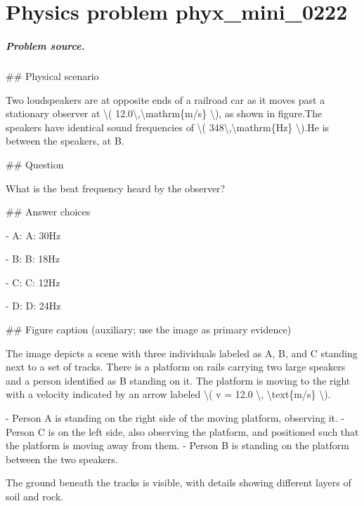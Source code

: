 
\chapter{Physics problem phyx\_mini\_0222}
\label{ch:PhyXMiniProblems_problem_phyx_mini_0222}

\paragraph{Problem source.}
\#\# Physical scenario

Two loudspeakers are at opposite ends of a railroad car as it moves past a stationary observer at \textbackslash{}( 12.0\textbackslash{},\textbackslash{}mathrm\{m/s\} \textbackslash{}), as shown in figure.The speakers have identical sound frequencies of \textbackslash{}( 348\textbackslash{},\textbackslash{}mathrm\{Hz\} \textbackslash{}).He is between the speakers, at B.

\#\# Question

What is the beat frequency heard by the observer?

\#\# Answer choices

- A: A: 30Hz

- B: B: 18Hz

- C: C: 12Hz

- D: D: 24Hz

\#\# Figure caption (auxiliary; use the image as primary evidence)

The image depicts a scene with three individuals labeled as A, B, and C standing next to a set of tracks. There is a platform on rails carrying two large speakers and a person identified as B standing on it. The platform is moving to the right with a velocity indicated by an arrow labeled \textbackslash{}( v = 12.0 \textbackslash{}, \textbackslash{}text\{m/s\} \textbackslash{}).

- Person A is standing on the right side of the moving platform, observing it.
- Person C is on the left side, also observing the platform, and positioned such that the platform is moving away from them.
- Person B is standing on the platform between the two speakers.

The ground beneath the tracks is visible, with details showing different layers of soil and rock.

